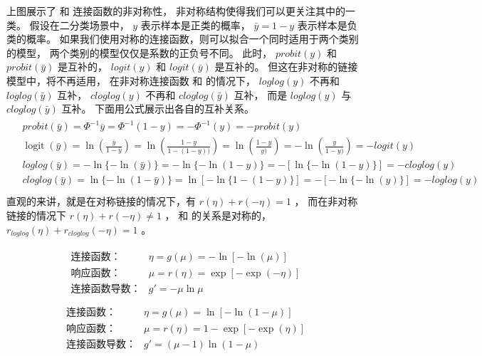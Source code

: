 \documentclass[letterpaper,10pt,english]{sphinxmanual}
\begin{document}
上图展示了  和  连接函数的非对称性，
非对称结构使得我们可以更关注其中的一类。
假设在二分类场景中， \(y\) 表示样本是正类的概率，
\(\bar{y}=1-y\) 表示样本是负类的概率。
如果我们使用对称的连接函数，则可以拟合一个同时适用于两个类别的模型，
两个类别的模型仅仅是系数的正负号不同。
此时，
\(probit(y)\) 和 \(probit(\bar{y})\) 是互补的，
\(logit(y)\) 和 \(logit(\bar{y})\) 是互补的。
但这在非对称的链接模型中，将不再适用，
在非对称连接函数  和  的情况下，
\(loglog(y)\) 不再和 \(loglog(\bar{y})\) 互补，
\(cloglog(y)\) 不再和 \(cloglog(\bar{y})\) 互补，
而是 \(loglog(y)\) 与 \(cloglog(\bar{y})\) 互补。
下面用公式展示出各自的互补关系。
\begin{align}\label{equation:二项模型/content:二项模型/content:47}\!\begin{aligned}
&probit(\bar{y})=\Phi^{-1}{\bar{y}}=\Phi^{-1}(1-y) = - \Phi^{-1}(y) = - probit(y)\\
&\mathop{logit}(\bar{y})
    = \ln \left( \frac{\bar{y}}{1-\bar{y}} \right )
    = \ln \left( \frac{1-y}{1-(1-y))} \right )
    = \ln \left( \frac{1-y}{y)} \right )
    = - \ln \left( \frac{y}{1-y)} \right )
    = - logit(y)\\
&loglog(\bar{y}) = -\ln\{ -\ln( \bar{y})\}
=-\ln\{ -\ln( 1-y)\}
=-[\ln\{ -\ln( 1-y)\}]
= - cloglog(y)\\
&cloglog(\bar{y}) = \ln\{ -\ln(1-\bar{y}) \}
= \ln [ -\ln \{ 1-(1-y)  \}]
= -[-\ln \{ -\ln(y) \}  ]
= -loglog(y)\\
\end{aligned}\end{align}
直观的来讲，就是在对称链接的情况下，有 \(r(\eta)+r(-\eta)=1\) ，
而在非对称链接的情况下 \(r(\eta)+r(-\eta) \neq 1\) ，
 和  的关系是对称的， \(r_{loglog}(\eta)+r_{cloglog}(-\eta) = 1\)
。

\begin{align}\label{equation:二项模型/content:二项模型/content:48}\!\begin{aligned}
\text{连接函数：}  & \eta = g(\mu) = -\ln [  -\ln( \mu ) ]\\
\text{响应函数：}  & \mu = r(\eta) = \exp [-\exp (-\eta) ]\\
\text{连接函数导数：} & g'= -\mu \ln \mu\\
\end{aligned}\end{align}
\begin{align}\label{equation:二项模型/content:二项模型/content:49}\!\begin{aligned}
\text{连接函数：}  & \eta = g(\mu) = \ln [  -\ln( 1- \mu ) ]\\
\text{响应函数：}  & \mu = r(\eta) = 1- \exp [-\exp (\eta) ]\\
\text{连接函数导数：} & g'= (\mu-1) \ln (1-\mu)\\
\end{aligned}\end{align}
\end{document}
